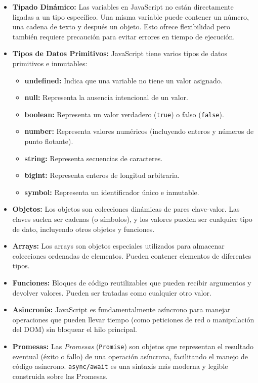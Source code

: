 \documentclass[a4paper, 12pt]{book}
\begin{document}
\begin{itemize}
  \item \textbf{Tipado Dinámico:} Las variables en JavaScript no están directamente ligadas a un tipo específico. Una misma variable puede contener un número, una cadena de texto y después un objeto. Esto ofrece flexibilidad pero también requiere precaución para evitar errores en tiempo de ejecución.

  \item \textbf{Tipos de Datos Primitivos:} JavaScript tiene varios tipos de datos primitivos e inmutables:
  \begin{itemize}
    \item \textbf{undefined:} Indica que una variable no tiene un valor asignado.
    \item \textbf{null:} Representa la ausencia intencional de un valor.
    \item \textbf{boolean:} Representa un valor verdadero (\texttt{true}) o falso (\texttt{false}).
    \item \textbf{number:} Representa valores numéricos (incluyendo enteros y números de punto flotante).
    \item \textbf{string:} Representa secuencias de caracteres.
    \item \textbf{bigint:} Representa enteros de longitud arbitraria.
    \item \textbf{symbol:} Representa un identificador único e inmutable.
  \end{itemize}

  \item \textbf{Objetos:} Los objetos son colecciones dinámicas de pares clave-valor. Las claves suelen ser cadenas (o símbolos), y los valores pueden ser cualquier tipo de dato, incluyendo otros objetos y funciones.

  \item \textbf{Arrays:} Los arrays son objetos especiales utilizados para almacenar colecciones ordenadas de elementos. Pueden contener elementos de diferentes tipos.

  \item \textbf{Funciones:} Bloques de código reutilizables que pueden recibir argumentos y devolver valores. Pueden ser tratadas como cualquier otro valor.

  \item \textbf{Asincronía:} JavaScript es fundamentalmente asíncrono para manejar operaciones que pueden llevar tiempo (como peticiones de red o manipulación del DOM) sin bloquear el hilo principal.
  
  \item \textbf{Promesas:} Las \textit{Promesas} (\texttt{Promise}) son objetos que representan el resultado eventual (éxito o fallo) de una operación asíncrona, facilitando el manejo de código asíncrono. \texttt{async/await} es una sintaxis más moderna y legible construida sobre las Promesas.
  
\end{itemize}
\end{document}
